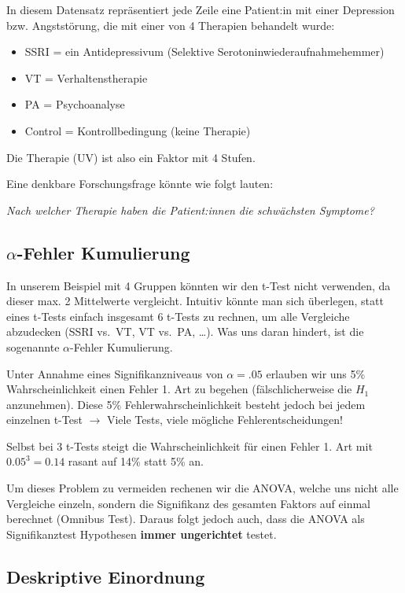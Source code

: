 \documentclass[
]{book}
\providecommand{\tightlist}{%
  \setlength{\itemsep}{0pt}\setlength{\parskip}{0pt}}
\begin{document}
In diesem Datensatz repräsentiert jede Zeile eine Patient:in mit einer Depression bzw. Angststörung, die mit einer von 4 Therapien behandelt wurde:

\begin{itemize}
\tightlist
\item
  SSRI = ein Antidepressivum (Selektive Serotoninwiederaufnahmehemmer)
\item
  VT = Verhaltenstherapie
\item
  PA = Psychoanalyse
\item
  Control = Kontrollbedingung (keine Therapie)
\end{itemize}

Die Therapie (UV) ist also ein Faktor mit 4 Stufen.

Eine denkbare Forschungsfrage könnte wie folgt lauten:

\emph{Nach welcher Therapie haben die Patient:innen die schwächsten Symptome?}

\subsection{\texorpdfstring{\(\alpha\)-Fehler Kumulierung}{\textbackslash alpha-Fehler Kumulierung}}\label{alpha-fehler-kumulierung}

In unserem Beispiel mit 4 Gruppen könnten wir den t-Test nicht verwenden, da dieser max. 2 Mittelwerte vergleicht. Intuitiv könnte man sich überlegen, statt eines t-Tests einfach insgesamt 6 t-Tests zu rechnen, um alle Vergleiche abzudecken (SSRI vs.~VT, VT vs.~PA, \ldots). Was uns daran hindert, ist die sogenannte \(\alpha\)-Fehler Kumulierung.

Unter Annahme eines Signifikanzniveaus von \(\alpha=.05\) erlauben wir uns 5\% Wahrscheinlichkeit einen Fehler 1. Art zu begehen (fälschlicherweise die \(H_1\) anzunehmen). Diese 5\% Fehlerwahrscheinlichkeit besteht jedoch bei jedem einzelnen t-Test \(\rightarrow\) Viele Tests, viele mögliche Fehlerentscheidungen!

Selbst bei 3 t-Tests steigt die Wahrscheinlichkeit für einen Fehler 1. Art mit \(0.05^3=0.14\) rasant auf 14\% statt 5\% an.

Um dieses Problem zu vermeiden rechenen wir die ANOVA, welche uns nicht alle Vergleiche einzeln, sondern die Signifikanz des gesamten Faktors auf einmal berechnet (Omnibus Test). Daraus folgt jedoch auch, dass die ANOVA als Signifikanztest Hypothesen \textbf{immer ungerichtet} testet.

\subsection{Deskriptive Einordnung}\label{deskriptive-einordnung-4}
\end{document}
